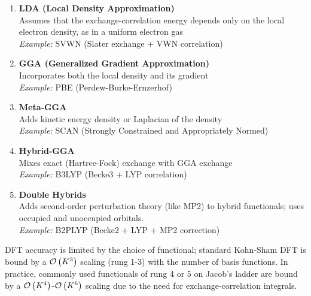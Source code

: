 \begin{samepage}
    \begin{enumerate}
        \item \textbf{LDA (Local Density Approximation)}\\
        Assumes that the exchange-correlation energy depends only on the local electron density, as in a uniform electron gas\\
        \textit{Example:} SVWN (Slater exchange + VWN correlation) \parencite{ref:slater1951, ref:vwn1980}
        
        \item \textbf{GGA (Generalized Gradient Approximation)}\\
        Incorporates both the local density and its gradient\\
        \textit{Example:} PBE (Perdew-Burke-Ernzerhof) \parencite{ref:perdew1996}
        
        \item \textbf{Meta-GGA}\\
        Adds kinetic energy density or Laplacian of the density\\
        \textit{Example:} SCAN (Strongly Constrained and Appropriately Normed) \parencite{ref:scan2015}
        
        \item \textbf{Hybrid-GGA}\\
        Mixes exact (Hartree-Fock) exchange with GGA exchange\\
        \textit{Example:} B3LYP (Becke3 + LYP correlation) \parencite{ref:lee_yang_parr_1988, ref:becke_1993}
        
        \item \textbf{Double Hybrids}\\
        Adds second-order perturbation theory (like MP2) to hybrid functionals; uses occupied and unoccupied orbitals.\\
        \textit{Example:} B2PLYP (Becke2 + LYP + MP2 correction) \parencite{ref:grimme2006}
    \end{enumerate}
\end{samepage}
DFT accuracy is limited by the choice of functional; standard Kohn-Sham DFT is bound by a $\mathcal{O}\left(K^3\right)$ scaling (rung 1-3) with the number of basis functions. In practice, commonly used functionals of rung 4 or 5 on Jacob's ladder are bound by a $\mathcal{O}\left(K^4\right)$-$\mathcal{O}\left(K^6\right)$ scaling due to the need for exchange-correlation integrals.

\newpage
